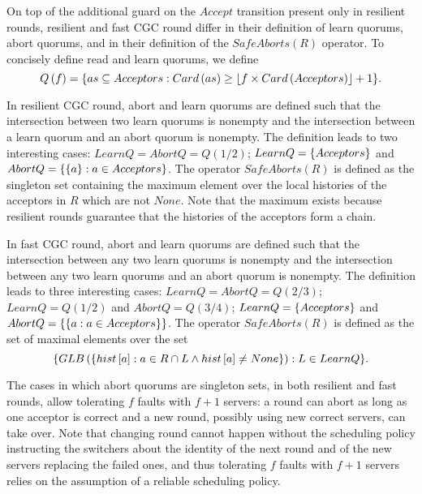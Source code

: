 On top of the additional guard on the $Accept$ transition present only
in resilient rounds, resilient and fast CGC round differ in
their definition of learn quorums, abort quorums, and in their
definition of the $SafeAborts\left( R \right)$ operator.
To concisely define read and learn quorums, we define 
\begin{equation}
    Q\left( f \right) = \aset{as \subseteq Acceptors :
        Card\left(as\right) \geq \left\lfloor f\times Card\left(
    Acceptors \right)\right\rfloor + 1}.
\end{equation}

In resilient CGC round, abort and learn quorums are defined such
that the intersection between two learn quorums is nonempty and the
intersection between a learn quorum and an abort quorum is nonempty.
The definition leads to two interesting cases: $LearnQ = AbortQ =
Q\left( 1/2 \right)$; $LearnQ = \left\{Acceptors\right\}$ and $AbortQ =
\left\{\left\{a\right\} : a \in Acceptors\right\}$. The operator $SafeAborts\left( R
\right)$ is defined as the singleton set containing the maximum
element over the local histories of the acceptors in $R$ which are not
$None$. Note that the maximum exists because resilient rounds
guarantee that the histories of the acceptors form a chain.

In fast CGC round, abort and learn quorums are defined such that
the intersection between any two learn quorums is nonempty and the
intersection between any two learn quorums and an abort quorum is
nonempty.  The definition leads to three interesting cases: $LearnQ =
AbortQ = Q\left( 2/3 \right)$; $LearnQ = Q\left( 1/2 \right)$ and
$AbortQ = Q\left( 3/4 \right)$; $LearnQ = \left\{Acceptors\right\}$ and
$AbortQ = \left\{\left\{a : a \in Acceptors\right\}\right\}$.
The operator $SafeAborts\left( R \right)$ is defined as the set of
maximal elements over the set 
\begin{equation}
\aset{GLB\left( \aset{hist\left[ a
\right] : a \in R \cap L \wedge hist\left[ a \right]\neq None} \right)
: L \in LearnQ}.
\end{equation}

The cases in which abort quorums are singleton sets, in both
resilient and fast rounds, allow tolerating
$f$ faults with $f+1$ servers: a round can abort as long as one
acceptor is correct and a new round, possibly using new correct
servers, can take over. Note that changing round cannot happen
without the scheduling policy instructing the switchers about the
identity of the next round and of the new servers replacing the failed ones, and thus tolerating $f$ faults with
$f+1$ servers relies on the assumption of a reliable scheduling policy.


